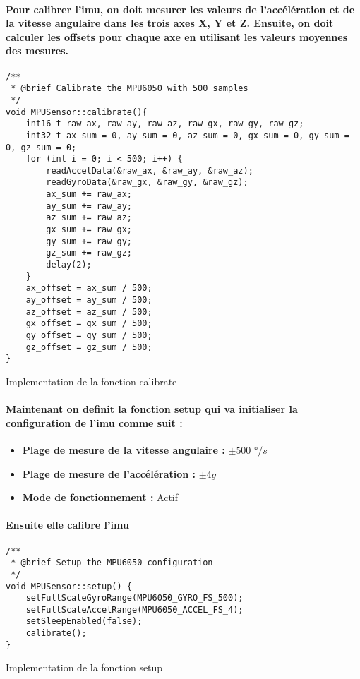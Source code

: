 \paragraph{Pour calibrer l'\gls{imu}, on doit mesurer les valeurs de l'accélération et de la vitesse angulaire dans les trois axes X, Y et Z. Ensuite, on doit calculer les offsets pour chaque axe en utilisant les valeurs moyennes des mesures.}
\begin{listing}[!htpb]
	\begin{verbatim}
/**
 * @brief Calibrate the MPU6050 with 500 samples
 */
void MPUSensor::calibrate(){
	int16_t raw_ax, raw_ay, raw_az, raw_gx, raw_gy, raw_gz;
	int32_t ax_sum = 0, ay_sum = 0, az_sum = 0, gx_sum = 0, gy_sum = 0, gz_sum = 0;
	for (int i = 0; i < 500; i++) {
		readAccelData(&raw_ax, &raw_ay, &raw_az);
		readGyroData(&raw_gx, &raw_gy, &raw_gz);
		ax_sum += raw_ax;
		ay_sum += raw_ay;
		az_sum += raw_az;
		gx_sum += raw_gx;
		gy_sum += raw_gy;
		gz_sum += raw_gz;
		delay(2);
	}
	ax_offset = ax_sum / 500;
	ay_offset = ay_sum / 500;
	az_offset = az_sum / 500;
	gx_offset = gx_sum / 500;
	gy_offset = gy_sum / 500;
	gz_offset = gz_sum / 500;
}
	\end{verbatim}
	\caption{Implementation de la fonction calibrate}
	\label{listing:mpu-calibrate}
\end{listing}

\newpage

\paragraph{Maintenant on definit la fonction setup qui va initialiser la configuration de l'\gls{imu} comme suit :}

\begin{itemize}
	\item \textbf{Plage de mesure de la vitesse angulaire :} $\pm 500$ °$/s$
	\item \textbf{Plage de mesure de l'accélération :} $\pm 4g$
	\item \textbf{Mode de fonctionnement :} Actif
\end{itemize}

\paragraph{Ensuite elle calibre l'\gls{imu}}

\begin{listing}[!htpb]
	\begin{verbatim}
/**
 * @brief Setup the MPU6050 configuration
 */
void MPUSensor::setup() {
	setFullScaleGyroRange(MPU6050_GYRO_FS_500);
	setFullScaleAccelRange(MPU6050_ACCEL_FS_4);
	setSleepEnabled(false);
	calibrate();
}
	\end{verbatim}
	\caption{Implementation de la fonction setup}
	\label{listing:mpu-setup}
\end{listing}


